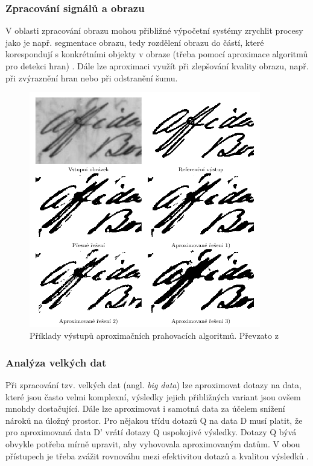 \subsubsection{Zpracování signálů a obrazu}
V oblasti zpracování obrazu mohou přibližné výpočetní systémy zrychlit procesy jako je např. segmentace obrazu, tedy rozdělení obrazu do částí, které korespondují s konkrétními objekty v obraze (třeba pomocí aproximace algoritmů pro detekci hran) \cite{segmentation_tech}. Dále lze aproximaci využít při zlepšování kvality obrazu, např. při zvýraznění hran nebo při odstranění šumu.

\begin{figure}[H]
    \centering
    \includegraphics[width=0.9\textwidth]{obrazky-figures/approx_thresholding.png}
    \caption{Příklady výstupů aproximačních prahovacích algoritmů. Převzato z \cite{approx_image}}
    \label{fig:approx_threshold}
\end{figure}

\subsubsection{Analýza velkých dat}
Při zpracování tzv. velkých dat (angl. \textit{big data}) lze aproximovat dotazy na data, které jsou často velmi komplexní, výsledky jejich přibližných variant jsou ovšem mnohdy dostačující. Dále lze aproximovat i samotná data za účelem snížení nároků na úložný prostor. Pro nějakou třídu dotazů Q na data D musí platit, že pro aproximovaná data D' vrátí dotazy Q uspokojivé výsledky. Dotazy Q bývá obvykle potřeba mírně upravit, aby vyhovovala aproximovaným datům. V obou přístupech je třeba zvážit rovnováhu mezi efektivitou dotazů a kvalitou výsledků \cite{approx_big_data}.

